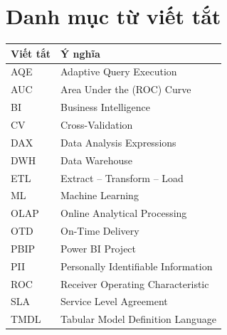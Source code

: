 \chapter*{Danh mục từ viết tắt}
\begin{longtable}{p{3cm}p{11cm}}
\toprule
\textbf{Viết tắt} & \textbf{Ý nghĩa} \\ \midrule
AQE   & Adaptive Query Execution \\
AUC   & Area Under the (ROC) Curve \\
BI    & Business Intelligence \\
CV    & Cross-Validation \\
DAX   & Data Analysis Expressions \\
DWH   & Data Warehouse \\
ETL   & Extract -- Transform -- Load \\
ML    & Machine Learning \\
OLAP  & Online Analytical Processing \\
OTD   & On-Time Delivery \\
PBIP  & Power BI Project \\
PII   & Personally Identifiable Information \\
ROC   & Receiver Operating Characteristic \\
SLA   & Service Level Agreement \\
TMDL  & Tabular Model Definition Language \\
\bottomrule
\end{longtable}

